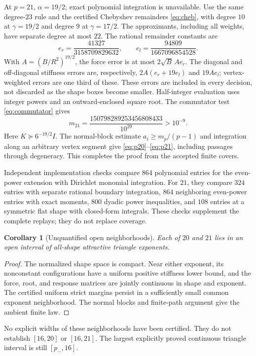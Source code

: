 \documentclass[11pt]{article}
\newtheorem{corollary}[theorem]{Corollary}
\theoremstyle{definition}
\newcommand{\pn}{p_{-}}
\begin{document}
At $p=21$, $\alpha=19/2$; exact polynomial integration is unavailable.
Use the same degree-$23$ rule and the certified Chebyshev remainders
\eqref{eq:cheb}, with degree $10$ at $\gamma=19/2$ and degree $9$ at
$\gamma=17/2$. The approximants, including all weights, have separate
degree at most $22$. The rational remainder constants are
\[
 e_r=\frac{41327}{3158709829632},\qquad
 e_l=\frac{94809}{1667096854528}.
\]
With $A=(B/R^2)^{19/2}$, the force error is at most
$2\sqrt B\,A e_r$. The diagonal and off-diagonal stiffness errors are,
respectively, $2A(e_r+19e_l)$ and $19Ae_l$; vertex-weighted errors are
one third of these. These errors are included in every decision, not
discarded as the shape boxes become smaller. Half-integer evaluation
uses integer powers and an outward-enclosed square root.
The commutator test \eqref{eq:commutator} gives
\[
 m_{21}=\frac{150798289253456808433}{10^{29}}>10^{-9}.
\]
Here $K\succeq6^{-19/2}I$. The normal-block estimate
$a_i\ge m_p/(p-1)$ and integration along an arbitrary vertex segment
give \eqref{eq:p20}--\eqref{eq:p21}, including passages through degeneracy.
This completes the proof from the accepted finite covers.

Independent implementation checks compare $864$ polynomial entries for the
even-power extension with Dirichlet monomial integration. For $21$, they
compare $324$ entries with separate rational boundary integration,
$864$ neighboring even-power entries with exact moments, $800$ dyadic
power inequalities, and $108$ entries at a symmetric flat shape with
closed-form integrals. These checks supplement the complete replays;
they do not replace coverage.

\begin{corollary}[Unquantified open neighborhoods]
Each of $20$ and $21$ lies in an open interval of all-shape attractive
triangle exponents.
\end{corollary}
\begin{proof}
The normalized shape space is compact. Near either exponent, its
nonconstant configurations have a uniform positive stiffness lower bound,
and the force, root, and response matrices are jointly continuous in shape
and exponent. The certified uniform strict margins persist in a sufficiently
small common exponent neighborhood. The normal blocks and finite-path
argument give the ambient finite law.
\end{proof}
No explicit widths of these neighborhoods have been certified. They do
not establish $[16,20]$ or $[16,21]$. The largest explicitly proved
continuous triangle interval is still $[\pn,16]$.
\end{document}

